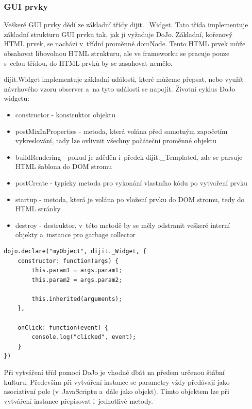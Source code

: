 \documentclass[bc,male,html,dept460]{diploma}				%
\begin{document}
\subsubsection{GUI prvky}
\label{sec:dojo-gui}
Veškeré GUI prvky dědí ze základní třídy dijit.\_Widget. Tato třída implementuje základní strukturu GUI prvku tak, jak ji vyžaduje DoJo.
Základní, kořenový HTML prvek, se nachází v~třídní proměnné domNode. Tento HTML prvek může obsahovat libovolnou HTML strukturu, ale ve frameworku se pracuje pouze s~celou třídou, do HTML prvků by se zasahovat nemělo.

dijit.Widget implementuje základní události, které můžeme přepsat, nebo využít návrhového vzoru observer a~na tyto události se napojit.
\bigskip
Životní cyklus DoJo widgetu:
\begin{itemize}
  \item constructor - konstruktor objektu
  \item postMixInProperties - metoda, která volána před samotným započetím vykreslování, tady lze ovlivnit všechny počáteční proměnné objektu
  \item buildRendering - pokud je zděděn i~předek dijit.\_Templated, zde se parsuje HTML šablona do DOM stromu
  \item postCreate - typicky metoda pro vykonání vlastního kódu po vytvoření prvku
  \item startup - metoda, která je volána po vložení prvku do DOM stromu, tedy do HTML stránky
  \item destroy - destruktor, v~této metodě by se měly odstranit veškeré interní objekty a~instance pro garbage collector
\end{itemize}

\begin{lstlisting}[label=src:JavaScript,caption=Třídy v~DoJo toolkit]
dojo.declare("myObject", dijit._Widget, {
	constructor: function(args) {
		this.param1 = args.param1;
		this.param2 = args.param2;
		
		this.inherited(arguments);
	},
	
	onClick: function(event) {
		console.log("clicked", event);
	}
})
\end{lstlisting}

Při vytváření tříd pomocí DoJo je vhodné dbát na předem určenou štábní kulturu. Především při vytváření instance se parametry vždy předávají jako asociativní pole (v~JavaScriptu a~dále jako objekt). Tímto objektem lze při vytváření instance přepisovat i~jednotlivé metody.
\end{document}
